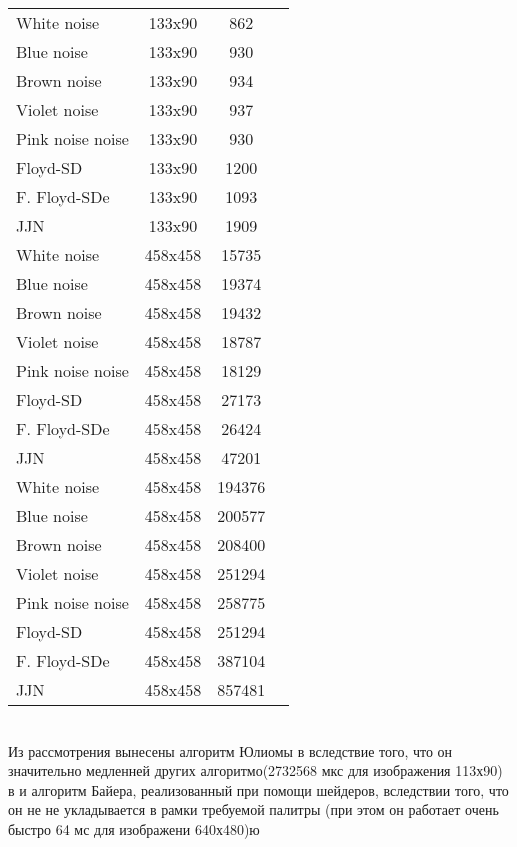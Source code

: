 \begin{tabular}{|@{\hspace*{2mm}}l||*{3}{c|}}\hline

	&\makebox[12em]{Размер, пиксели}&\makebox[6em]{Время, мкс}
	\\\hline\hline
	White noise&133x90&862\\\hline
	Blue noise&133x90&930\\\hline
	Brown noise&133x90&934\\\hline
	Violet noise &133x90&937\\\hline
	Pink noise noise&133x90&930\\\hline
	Floyd-SD&133x90&1200\\\hline
	F. Floyd-SDe&133x90&1093\\\hline
	JJN &133x90&1909\\\hline
	White noise&458x458&15735\\\hline
	Blue noise&458x458&19374\\\hline
	Brown noise&458x458&19432\\\hline
	Violet noise &458x458&18787\\\hline
	Pink noise noise&458x458&18129\\\hline
	Floyd-SD&458x458&27173\\\hline
	F. Floyd-SDe&458x458&26424\\\hline
	JJN &458x458&47201\\\hline
	White noise&458x458&194376\\\hline
	Blue noise&458x458&200577\\\hline
	Brown noise&458x458&208400\\\hline
	Violet noise &458x458&251294\\\hline
	Pink noise noise&458x458&258775\\\hline
	Floyd-SD&458x458&251294\\\hline
	F. Floyd-SDe&458x458&387104\\\hline
	JJN &458x458&857481\\\hline
\end{tabular}
\bigskip
\\
Из рассмотрения вынесены алгоритм Юлиомы в вследствие того, что он значительно медленней других алгоритмо(2732568 мкс для изображения 113х90) в и алгоритм Байера, реализованный при помощи шейдеров, вследствии того, что он не не укладывается в рамки требуемой палитры (при этом он работает очень быстро 64 мс для изображени 640х480)ю
